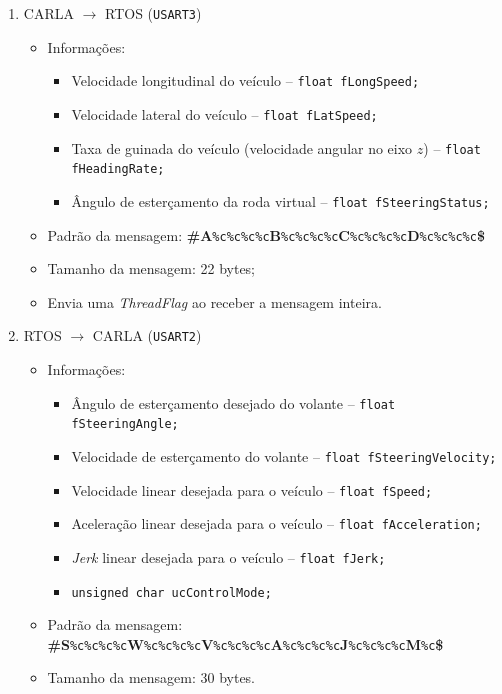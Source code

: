 \begin{enumerate}
	\item CARLA $\longrightarrow$ RTOS (\texttt{USART3})
	\begin{itemize}
		\item Informações:
		\begin{itemize}
			\item Velocidade longitudinal do veículo -- \texttt{float fLongSpeed;}
			\item Velocidade lateral do veículo -- \texttt{float fLatSpeed;}
			\item Taxa de guinada do veículo (velocidade angular no eixo $z$) -- \texttt{float fHeadingRate;}
			\item Ângulo de esterçamento da roda virtual -- \texttt{float fSteeringStatus;}		
		\end{itemize}
		\item Padrão da mensagem: \textbf{\#A}\texttt{\%c\%c\%c\%c}\textbf{B}\texttt{\%c\%c\%c\%c}\textbf{C}\texttt{\%c\%c\%c\%c}\textbf{D}\texttt{\%c\%c\%c\%c}\textbf{\$}
		\item Tamanho da mensagem: 22 bytes;
		\item Envia uma \textit{ThreadFlag} ao receber a mensagem inteira.
		
	\end{itemize}
	\item RTOS $\longrightarrow$ CARLA (\texttt{USART2})
	\begin{itemize}
		\item Informações:
		\begin{itemize}
			\item Ângulo de esterçamento desejado do volante -- \texttt{float fSteeringAngle;}
			\item Velocidade de esterçamento do volante -- \texttt{float fSteeringVelocity;}
			\item Velocidade linear desejada para o veículo -- \texttt{float fSpeed;}
			\item Aceleração linear desejada para o veículo -- \texttt{float fAcceleration;}
			\item \textit{Jerk} linear desejada para o veículo -- \texttt{float fJerk;}	
			\item \texttt{unsigned char ucControlMode;}		
		\end{itemize}
		\item Padrão da mensagem: \textbf{\#S}\texttt{\%c\%c\%c\%c}\textbf{W}\texttt{\%c\%c\%c\%c}\textbf{V}\texttt{\%c\%c\%c\%c}\textbf{A}\texttt{\%c\%c\%c\%c}\textbf{J}\texttt{\%c\%c\%c\%c}\textbf{M}\texttt{\%c}\textbf{\$}
		\item Tamanho da mensagem: 30 bytes.
		
	\end{itemize}
\end{enumerate}


